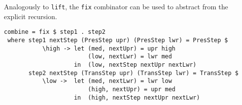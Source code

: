 \par Analogously to \texttt{lift}, the \texttt{fix} combinator can be used
        to abstract from the explicit recursion.\begin{small}\begin{verbatim}combine = fix $ step1 . step2
 where step1 nextStep (PresStep upr) (PresStep lwr) = PresStep $
           \high -> let (med, nextUpr) = upr high
                        (low, nextLwr) = lwr med
                    in  (low, nextStep nextUpr nextLwr)
       step2 nextStep (TransStep upr) (TransStep lwr) = TransStep $
           \low ->  let (med, nextLwr) = lwr low
                        (high, nextUpr) = upr med
                    in  (high, nextStep nextUpr nextLwr)\end{verbatim}\end{small}

